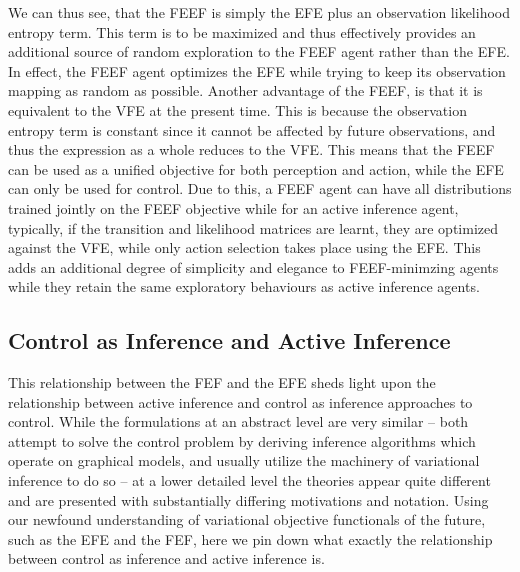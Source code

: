 We can thus see, that the FEEF is simply the EFE plus an observation likelihood entropy term. This term is to be maximized and thus effectively provides an additional source of random exploration to the FEEF agent rather than the EFE. In effect, the FEEF agent optimizes the EFE while trying to keep its observation mapping as random as possible. Another advantage of the FEEF, is that it is equivalent to the VFE at the present time. This is because the observation entropy term is constant since it cannot be affected by future observations, and thus the expression as a whole reduces to the VFE. This means that the FEEF can be used as a unified objective for both perception and action, while the EFE can only be used for control. Due to this, a FEEF agent can have all distributions trained jointly on the FEEF objective while for an active inference agent, typically, if the transition and likelihood matrices are learnt, they are optimized against the VFE, while only action selection takes place using the EFE. This adds an additional degree of simplicity and elegance to FEEF-minimzing agents while they retain the same exploratory behaviours as active inference agents.

\subsection{Control as Inference and Active Inference}

This relationship between the FEF and the EFE sheds light upon the relationship between active inference and control as inference approaches to control. While the formulations at an abstract level are very similar -- both attempt to solve the control problem by deriving inference algorithms which operate on graphical models, and usually utilize the machinery of variational inference to do so -- at a lower detailed level the theories appear quite different and are presented with substantially differing motivations and notation. Using our newfound understanding of variational objective functionals of the future, such as the EFE and the FEF, here we pin down what exactly the relationship between control as inference and active inference is. 

